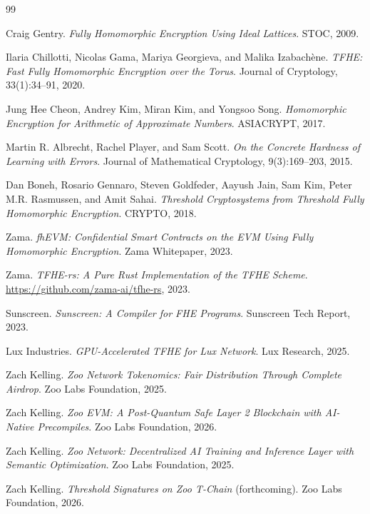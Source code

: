\documentclass[11pt,letterpaper]{article}
\theoremstyle{definition}
\theoremstyle{remark}
\begin{document}
\begin{thebibliography}{99}

Craig Gentry.
\textit{Fully Homomorphic Encryption Using Ideal Lattices}.
STOC, 2009.

Ilaria Chillotti, Nicolas Gama, Mariya Georgieva, and Malika Izabach\`{e}ne.
\textit{TFHE: Fast Fully Homomorphic Encryption over the Torus}.
Journal of Cryptology, 33(1):34--91, 2020.

Jung Hee Cheon, Andrey Kim, Miran Kim, and Yongsoo Song.
\textit{Homomorphic Encryption for Arithmetic of Approximate Numbers}.
ASIACRYPT, 2017.

Martin R. Albrecht, Rachel Player, and Sam Scott.
\textit{On the Concrete Hardness of Learning with Errors}.
Journal of Mathematical Cryptology, 9(3):169--203, 2015.

Dan Boneh, Rosario Gennaro, Steven Goldfeder, Aayush Jain, Sam Kim, Peter M.R. Rasmussen, and Amit Sahai.
\textit{Threshold Cryptosystems from Threshold Fully Homomorphic Encryption}.
CRYPTO, 2018.

Zama.
\textit{fhEVM: Confidential Smart Contracts on the EVM Using Fully Homomorphic Encryption}.
Zama Whitepaper, 2023.

Zama.
\textit{TFHE-rs: A Pure Rust Implementation of the TFHE Scheme}.
\url{https://github.com/zama-ai/tfhe-rs}, 2023.

Sunscreen.
\textit{Sunscreen: A Compiler for FHE Programs}.
Sunscreen Tech Report, 2023.

Lux Industries.
\textit{GPU-Accelerated TFHE for Lux Network}.
Lux Research, 2025.

Zach Kelling.
\textit{Zoo Network Tokenomics: Fair Distribution Through Complete Airdrop}.
Zoo Labs Foundation, 2025.

Zach Kelling.
\textit{Zoo EVM: A Post-Quantum Safe Layer 2 Blockchain with AI-Native Precompiles}.
Zoo Labs Foundation, 2026.

Zach Kelling.
\textit{Zoo Network: Decentralized AI Training and Inference Layer with Semantic Optimization}.
Zoo Labs Foundation, 2025.

Zach Kelling.
\textit{Threshold Signatures on Zoo T-Chain} (forthcoming).
Zoo Labs Foundation, 2026.

\end{thebibliography}
\end{document}
